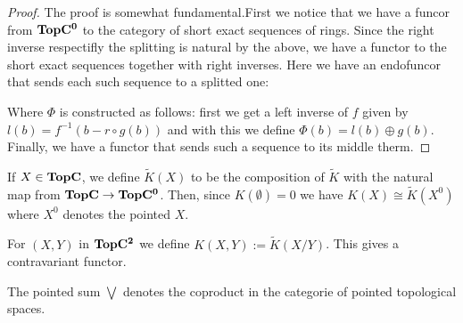 \begin{proof}
	The proof is somewhat fundamental.First we notice that we have a funcor from $\operatorname{\mathbf{TopC^0}}$ to the category of short exact sequences of rings. Since the right inverse respectifly the splitting is natural by the above, we have a functor to the short exact sequences together with right inverses. Here we have an endofuncor that sends each such sequence to a splitted one:
	Where $\Phi$ is constructed as follows: 
	first we get a left inverse of $f$ given by $l(b)=f^{-1}(b-r\circ g(b))$ and with this we define $\Phi(b)=l(b)\oplus g(b)$. Finally, we have a functor that sends such a sequence to its middle therm. 
\end{proof}
\begin{corollary} \label{cor: reduced Ktheory is unpointed K-theory}
	If $X\in \operatorname{\mathbf{TopC}}$, we define $\tilde{K}(X)$ to be the composition of $\tilde{K}$ with the natural map from $\operatorname{\mathbf{TopC}} \to \operatorname{\mathbf{TopC^0}}$. Then, since $K(\emptyset)=0$ we have $K(X)\cong \tilde{K}(X^0)$ where $X^0$ denotes the pointed $X$.
\end{corollary}
\begin{definition}
	For $(X,Y)$ in $\operatorname{\mathbf{TopC^2}}$ we define $K(X,Y):=\tilde{K}(X/Y)$. This gives a contravariant functor. 
\end{definition}
\begin{corollary}
	The pointed sum $\bigvee$ denotes the coproduct in the categorie of pointed topological spaces.
\end{corollary}
